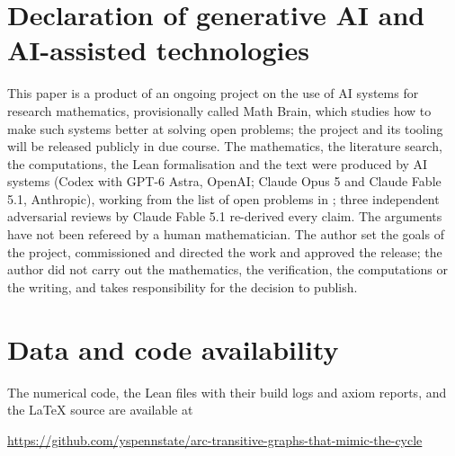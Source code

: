 \documentclass[11pt]{amsart}
\theoremstyle{definition}
\begin{document}
\section*{Declaration of generative AI and AI-assisted technologies}
This paper is a product of an ongoing project on the use of AI systems for research mathematics, provisionally called Math Brain, which studies how to make such systems better at solving open problems; the project and its tooling will be released publicly in due course. The mathematics, the literature search, the computations, the Lean formalisation and the text were produced by AI systems (Codex with GPT-6 Astra, OpenAI; Claude Opus 5 and Claude Fable 5.1, Anthropic), working from the list of open problems in \cite{AF}; three independent adversarial reviews by Claude Fable 5.1 re-derived every claim. The arguments have not been refereed by a human mathematician. The author set the goals of the project, commissioned and directed the work and approved the release; the author did not carry out the mathematics, the verification, the computations or the writing, and takes responsibility for the decision to publish.

\section*{Data and code availability}
The numerical code, the Lean files with their build logs and axiom reports, and the \LaTeX{} source are available at
\begin{center}
\url{https://github.com/yspennstate/arc-transitive-graphs-that-mimic-the-cycle}
\end{center}
\end{document}
